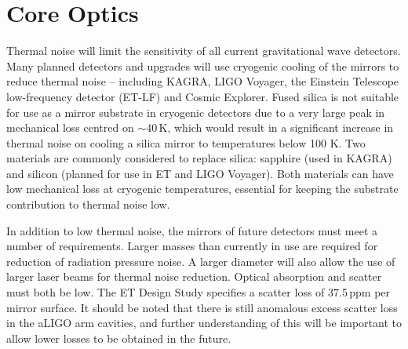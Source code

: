 \chapter{Core Optics}
\label{sec:Core_optics}
Thermal noise will limit the sensitivity of all current gravitational wave detectors. Many planned detectors and upgrades will use cryogenic cooling of the mirrors to reduce thermal noise -- including KAGRA, LIGO Voyager, the Einstein Telescope low-frequency detector (ET-LF) and Cosmic Explorer. Fused silica is not suitable for use as a mirror substrate in cryogenic detectors due to a very large peak in mechanical loss centred on $\sim$40\,K, which would result in a significant increase in thermal noise on cooling a silica mirror to temperatures below 100 K.  Two materials are commonly considered to replace silica: sapphire (used in KAGRA) and silicon (planned for use in ET and LIGO Voyager). Both materials can have low mechanical loss at cryogenic temperatures, essential for keeping the substrate contribution to thermal noise low. 

In addition to low thermal noise, the mirrors of future detectors must meet a number of requirements. Larger masses than currently in use are required for reduction of radiation pressure noise. A larger diameter will also allow the use of larger laser beams for thermal noise reduction. Optical absorption and scatter must both be low. The ET Design Study\cite{ET2011} specifies a scatter loss of 37.5\,ppm per mirror surface. It should be noted that there is still anomalous excess scatter loss in the aLIGO arm cavities, and further understanding of this will be important to allow lower losses to be obtained in the future. 


